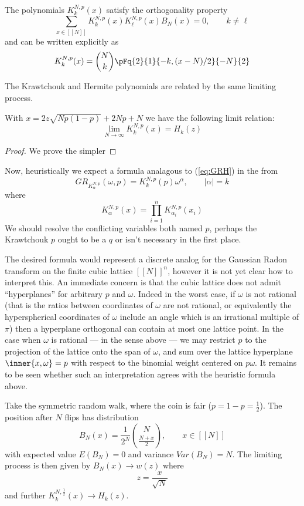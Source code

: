 The polynomials $K^{N,p}_k(x)$ satisfy the orthogonality property
\[
  \sum_{x \in [[N]]} K^{N,p}_k(x) K^{N,p}_\ell(x) B_N(x) = 0, \qquad k \neq \ell
\]
and can be written explicitly as
\[
  K^{N,p}_k(x) = \binom{N}{k} \pFq{2}{1}{-k,(x - N)/2}{-N}{2}
\]

The Krawtchouk and Hermite polynomials are related by the same limiting process.
\begin{proposition}
  With $x = 2 z \sqrt{Np(1-p)} + 2Np + N$ we have the following limit relation:
  \[
    \lim_{N \rightarrow \infty} K^{N,p}_k(x) = H_k(z)
  \]
\end{proposition}

\begin{proof}
  We prove the simpler 
\end{proof}

Now, heuristically we expect a formula analagous to (\ref{eq:GRH}) in the from
\[
  GR_{K^{N,p}_\alpha}(\omega, p) = K^{N,p}_k(p)\omega^\alpha, \qquad |\alpha| = k
\]
where 
\[
  K^{N,p}_\alpha(x) = \prod_{i = 1}^n K^{N,p}_{\alpha_i}(x_i)
\]
We should resolve the conflicting variables both named $p$, perhaps the Krawtchouk $p$ ought to be a $q$ or isn't necessary in the first place.

The desired formula would represent a discrete analog for the Gaussian Radon transform on the finite cubic lattice $[[N]]^n$, however it is not yet clear how to interpret this. An immediate concern is that the cubic lattice does not admit ``hyperplanes'' for arbitrary $p$ and $\omega$. Indeed in the worst case, if $\omega$ is not rational (that is the ratios between coordinates of $\omega$ are not rational, or equivalently the hyperspherical coordinates of $\omega$ include an angle which is an irrational multiple of $\pi$) then a hyperplane orthogonal can contain at most one lattice point. In the case when $\omega$ is rational — in the sense above — we may restrict $p$ to the projection of the lattice onto the span of $\omega$, and sum over the lattice hyperplane $\inner{x, \omega} = p$ with respect to the binomial weight centered on $p\omega$. It remains to be seen whether such an interpretation agrees with the heuristic formula above.

Take the symmetric random walk, where the coin is fair ($p = 1 - p = \frac12$). The position after $N$ flips has distribution
\[
  B_N(x) = \frac1{2^N}\binom{N}{\frac{N+x}2}, \qquad x \in [[N]]
\]
with expected value $E(B_N) = 0$ and variance $Var(B_N) = N$. The limiting process is then given by $B_N(x) \rightarrow w(z)$ where 
\[
  z = \frac{x}{\sqrt{N}}
\]
and further $K^{N,\frac12}_k(x) \rightarrow H_k(z)$.


